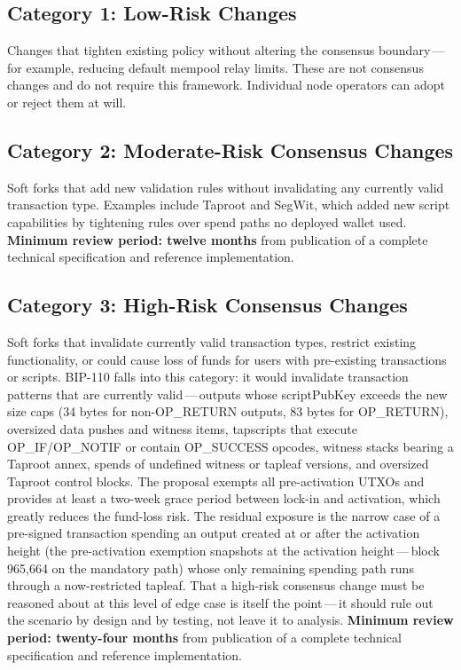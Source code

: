 \documentclass[11pt, twoside, openright]{book}
\begin{document}
\subsection*{Category 1: Low-Risk Changes}

Changes that tighten existing policy without altering the consensus boundary\,---\,for example, reducing default mempool relay limits. These are not consensus changes and do not require this framework. Individual node operators can adopt or reject them at will.

\subsection*{Category 2: Moderate-Risk Consensus Changes}

Soft forks that add new validation rules without invalidating any currently valid transaction type. Examples include Taproot and SegWit, which added new script capabilities by tightening rules over spend paths no deployed wallet used. \textbf{Minimum review period: twelve months} from publication of a complete technical specification and reference implementation.

\subsection*{Category 3: High-Risk Consensus Changes}

Soft forks that invalidate currently valid transaction types, restrict existing functionality, or could cause loss of funds for users with pre-existing transactions or scripts. BIP-110 falls into this category: it would invalidate transaction patterns that are currently valid\,---\,outputs whose scriptPubKey exceeds the new size caps (34 bytes for non-OP\_RETURN outputs, 83 bytes for OP\_RETURN), oversized data pushes and witness items, tapscripts that execute OP\_IF/OP\_NOTIF or contain OP\_SUCCESS opcodes, witness stacks bearing a Taproot annex, spends of undefined witness or tapleaf versions, and oversized Taproot control blocks. The proposal exempts all pre-activation UTXOs and provides at least a two-week grace period between lock-in and activation, which greatly reduces the fund-loss risk. The residual exposure is the narrow case of a pre-signed transaction spending an output created at or after the activation height (the pre-activation exemption snapshots at the activation height\,---\,block 965{,}664 on the mandatory path) whose only remaining spending path runs through a now-restricted tapleaf. That a high-risk consensus change must be reasoned about at this level of edge case is itself the point\,---\,it should rule out the scenario by design and by testing, not leave it to analysis. \textbf{Minimum review period: twenty-four months} from publication of a complete technical specification and reference implementation.
\end{document}
